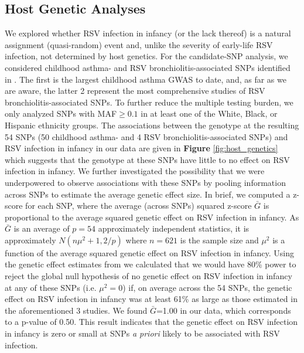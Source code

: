 \documentclass{article} %
\begin{document}
\clearpage										

\subsection{Host Genetic Analyses}
We explored whether RSV infection in infancy (or the lack thereof) is a natural assignment (quasi-random) event and, unlike the severity of early-life RSV infection,
\citep{larkin2015genes}
not determined by host genetics. 
For the candidate-SNP analysis, we considered childhood asthma- and RSV bronchiolitis-associated SNPs identified in 
\citet{pividori2019shared, janssen2007genetic, pasanen2017genome}.
The first is the largest childhood asthma GWAS to date, and, as far as we are aware, the latter 2 represent the most comprehensive studies of RSV bronchiolitis-associated SNPs. 
To further reduce the multiple testing burden, we only analyzed SNPs with MAF$\ge 0.1$ in at least one of the White, Black, or Hispanic ethnicity groups. 
The associations between the genotype at the resulting 54 SNPs (50 childhood asthma- and 4 RSV bronchiolitis-associated SNPs) and RSV infection in infancy in our data are given in 
\textbf{Figure} \ref{fig:host_genetics}
which suggests that the genotype at these SNPs have little to no effect on RSV infection in infancy. 
We further investigated the possibility that we were underpowered to observe associations with these SNPs by pooling information across SNPs to estimate the average genetic effect size. 
In brief, we computed a z-score for each SNP, where the average (across SNPs) squared z-score $\bar{G}$ is proportional to the average squared genetic effect on RSV infection in infancy. 
As $\bar{G}$ is an average of $p=54$ approximately independent statistics, 
it is approximately
$N(n\mu^2 + 1,2/p)$
where $n=621$ is the sample size and $\mu^2$ is a function of the average squared genetic effect on RSV infection in infancy. 
Using the genetic effect estimates from 
\citet{pividori2019shared, janssen2007genetic, pasanen2017genome}
we calculated that we would have 80\% power to reject the global null hypothesis of no genetic effect on RSV infection in infancy at any of these SNPs (i.e. $\mu^2 =0$) if, on average across the 54 SNPs, the genetic effect on RSV infection in infancy was at least 61\% as large as those estimated in the aforementioned 3 studies. 
We found $\bar{G}$=1.00 in our data, which corresponds to a p-value of 0.50. 
This result indicates that the genetic effect on RSV infection in infancy is zero or small at SNPs \textit{a priori} likely to be associated with RSV infection.	
\end{document}
